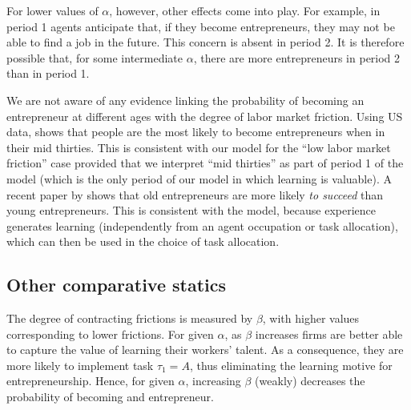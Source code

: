 \documentclass[12pt,american]{paper}
\theoremstyle{remark}
\begin{document}
%
For lower values of $\alpha$, however,  other effects come into play. %
For example, in period 1 agents anticipate that, if they become entrepreneurs, they may not be able to find a job in the future. This concern is absent in period 2. It is therefore possible that, for some intermediate $\alpha$, there are more entrepreneurs in period 2 than in period 1. 

We are not aware of any evidence linking  the probability of becoming an entrepreneur at different ages with the degree of labor market friction. Using US data, \cite{Hincapie2020} shows that people are the most likely to become entrepreneurs when in their mid thirties.  This is consistent with our model for the ``low labor market friction'' case provided that we interpret ``mid thirties'' as part of  period 1 of the model (which is the only period of our model in which learning is valuable).
A  recent  paper by \cite*{Azoulay2020} shows that old entrepreneurs are more likely \textit{to succeed} than young entrepreneurs. This is consistent with the model, because experience generates learning (independently from an agent occupation or task allocation), which can then be used in the choice of task allocation.

\subsection{Other comparative statics}

The degree of contracting frictions is measured by $\beta$, with higher values corresponding to lower frictions.  For given $\alpha$, as $\beta$ increases firms are better able to capture the value of learning their workers' talent. As a consequence, they are more likely to implement task $\tau_1=A$, thus eliminating the learning motive for entrepreneurship. Hence, for given $\alpha$, increasing $\beta$ (weakly) decreases the probability of becoming and entrepreneur.
\end{document}
